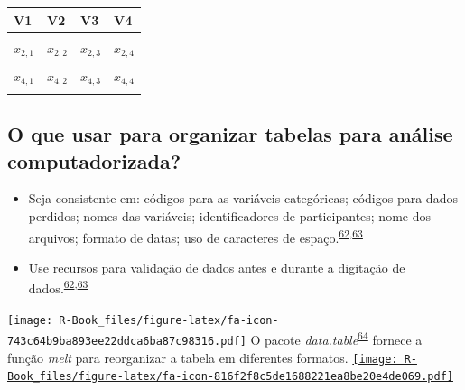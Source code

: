 \documentclass[
]{book}
\begin{document}
\begin{tabu} to 
\toprule
\textbf{V1} & \textbf{V2} & \textbf{V3} & \textbf{V4}\\
\midrule
{} &  &  & \\
$x_{2,1}$ & $x_{2,2}$ & $x_{2,3}$ & $x_{2,4}$\\
 &  &  & \\
$x_{4,1}$ & $x_{4,2}$ & $x_{4,3}$ & $x_{4,4}$\\
 &  &  & \\
\bottomrule
\end{tabu}

\hypertarget{o-que-usar-para-organizar-tabelas-para-anuxe1lise-computadorizada}{%
\subsection{O que usar para organizar tabelas para análise computadorizada?}\label{o-que-usar-para-organizar-tabelas-para-anuxe1lise-computadorizada}}

\begin{itemize}
\item
  Seja consistente em: códigos para as variáveis categóricas; códigos para dados perdidos; nomes das variáveis; identificadores de participantes; nome dos arquivos; formato de datas; uso de caracteres de espaço.\textsuperscript{\protect\hyperlink{ref-broman2018}{62},\protect\hyperlink{ref-Juluru2015}{63}}
\item
  Use recursos para validação de dados antes e durante a digitação de dados.\textsuperscript{\protect\hyperlink{ref-broman2018}{62},\protect\hyperlink{ref-Juluru2015}{63}}
\end{itemize}

\texttt{[image: R-Book\_files/figure-latex/fa-icon-743c64b9ba893ee22ddca6ba87c98316.pdf]} O pacote \emph{data.table}\textsuperscript{\protect\hyperlink{ref-data.table}{64}} fornece a função \emph{melt} para reorganizar a tabela em diferentes formatos. \href{https://cran.r-project.org/web/packages/data.table/index.html}{\texttt{[image: R-Book\_files/figure-latex/fa-icon-816f2f8c5de1688221ea8be20e4de069.pdf]}}
\end{document}

